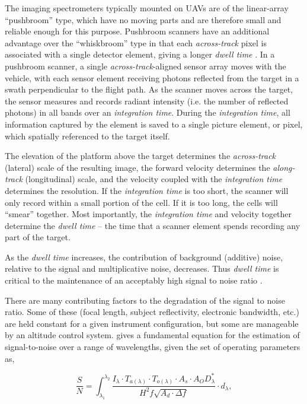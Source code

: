 \documentclass[10pt]{article}
\begin{document}
The imaging spectrometers typically mounted on UAVs are of the linear-array ``pushbroom'' type, which have no moving parts and are therefore small and reliable enough for this purpose. Pushbroom scanners have an additional advantage over the ``whiskbroom'' type in that each \emph{across-track} pixel is associated with a single detector element, giving a longer \emph{dwell time} \cite{Goetz1985}. In a pushbroom scanner, a single \emph{across-track}-aligned sensor array moves with the vehicle, with each sensor element receiving photons reflected from the target in a swath perpendicular to the flight path. As the scanner moves across the target, the sensor measures and records radiant intensity (i.e. the number of reflected photons) in all bands over an \emph{integration time}. During the \emph{integration time}, all information captured by the element is saved to a single picture element, or pixel, which spatially referenced to the target itself. 

The elevation of the platform above the target determines the \emph{across-track} (lateral) scale of the resulting image, the forward velocity determines the \emph{along-track} (longitudinal) scale, and the velocity coupled with the \emph{integration time} determines the resolution. If the \emph{integration time} is too short, the scanner will only record within a small portion of the cell. If it is  too long, the cells will ``smear'' together. Most importantly, the \emph{integration time} and velocity together determine the \emph{dwell time} -- the time that a scanner element spends recording any part of the target. 

As the \emph{dwell time} increases, the contribution of background (additive) noise, relative to the signal and multiplicative noise, decreases. Thus \emph{dwell time} is critical to the maintenance of an acceptably high signal to noise ratio \cite{F.MarkDanson1996,Avery1992,Rogass2014}. 

There are many contributing factors to the degradation of the signal to noise ratio. Some of these (focal length, subject reflectivity, electronic bandwidth, etc.) \cite{Gupta2018} are held constant for a given instrument configuration, but some are manageable by an altitude control system. \cite{Gupta2018} gives a fundamental equation for the estimation of signal-to-noise over a range of wavelengths, given the set of operating parameters as, 

\begin{equation}
\frac{S}{N} = \int_{\lambda_1}^{\lambda_2} \frac{ 
	I_{\lambda} \cdot T_{a(\lambda)} \cdot T_{o(\lambda)} \cdot A_s \cdot A_{O}D_{\lambda}^*
} {
	H^2 f\sqrt{A_d \cdot \Delta f}
} \cdot d_{\lambda},
\end{equation}
\end{document}
